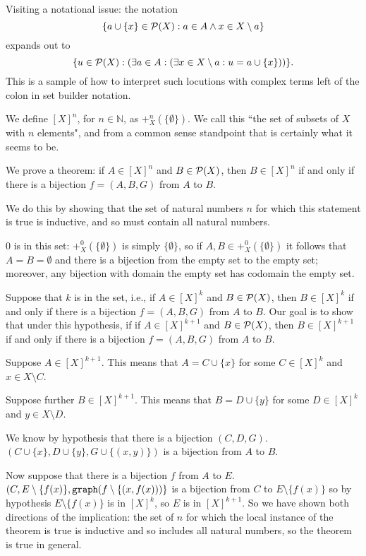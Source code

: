 \documentclass[12pt]{article}
\begin{document}
\begin{description}
Visiting a notational issue:  the notation $$\{a \cup \{x\}\in {\cal P}(X):  a \in A \wedge x \in X\setminus a\}$$ expands out to
$$\{u \in {\cal P}(X):(\exists a \in A:(\exists x \in X\setminus a:u = a \cup \{x\}))\}.$$   This is a sample of how to interpret such locutions with complex terms left of the colon in set builder notation.

We define $[X]^n$, for $n \in {\mathbb N}$, as $+_X^n(\{\emptyset\})$.  We call this ``the set of subsets of $X$ with $n$ elements", and from a common sense standpoint that is certainly what it seems to be.

We prove a theorem:  if $A \in [X]^n$ and $B \in {\cal P}(X)$, then $B \in [X]^n$ if and only if there is a bijection $f=(A,B,G)$ from $A$ to $B$.

We do this by showing that the set of natural numbers $n$ for which this statement is true is inductive, and so must contain all natural numbers.

0 is in this set:  $+_X^0(\{\emptyset\})$ is simply $\{\emptyset\}$, so if $A,B \in +_X^0(\{\emptyset\})$ it follows
that $A=B=\emptyset$ and there is a bijection from the empty set to the empty set;  moreover, any bijection with domain the empty set has codomain the empty set.

Suppose that $k$ is in the set, i.e.,  if $A \in [X]^k$ and $B \in {\cal P}(X)$, then $B \in [X]^k$ if and only if there is a bijection $f=(A,B,G)$ from $A$ to $B$.  Our goal is to show that under this hypothesis, if  if $A \in [X]^{k+1}$ and $B \in {\cal P}(X)$, then $B \in [X]^{k+1}$ if and only if there is a bijection $f=(A,B,G)$ from $A$ to $B$.

Suppose $A \in [X]^{k+1}$.  This means that $A = C \cup \{x\}$ for some $C \in [X]^k$ and $x \in X\setminus C$.

Suppose further $B \in [X]^{k+1}$.  This means that $B = D \cup \{y\}$ for some $D \in [X]^k$ and $y \in X\setminus D$.

We know by hypothesis that there is a bijection $(C,D,G)$.  $(C \cup \{x\},D\cup \{y\},G \cup \{(x,y)\})$ is a bijection from $A$ to $B$.

Now suppose that there is a bijection $f$ from $A$ to $E$.  $(C,E\setminus \{f(x)\},{\tt graph}(f \setminus \{(x,f(x)))\}$  is a bijection from $C$ to $E\setminus \{f(x)\}$ so by hypothesis $E\setminus \{f(x)\}$ is in $[X]^k$, so $E$ is in 
$[X]^{k+1}$.  So we have shown both directions of the implication: the set of $n$ for which the local instance of the theorem is true is inductive and so includes all natural numbers, so the theorem is true in general.


\end{description}
\end{document}
